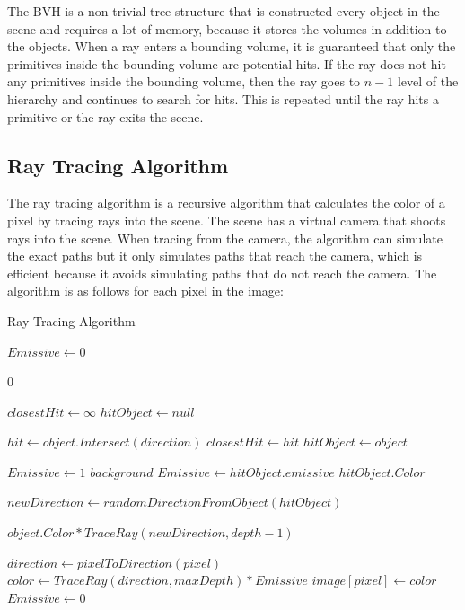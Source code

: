 \documentclass[12pt]{article}
\begin{document}
The BVH is a non-trivial tree structure that is constructed every object in the scene and requires a lot of memory, because
it stores the volumes in addition to the objects.
When a ray enters a bounding volume, it is guaranteed that only the primitives inside the bounding volume are potential hits.
If the ray does not hit any primitives inside the bounding volume, then the ray goes to $n-1$ level of the hierarchy and continues
to search for hits. This is repeated until the ray hits a primitive or the ray exits the scene.

\subsection{Ray Tracing Algorithm}

The ray tracing algorithm is a recursive algorithm that calculates the color of a pixel by tracing rays into the scene.
The scene has a virtual camera that shoots rays into the scene.
When tracing from the camera, the algorithm can simulate the exact paths but it only simulates paths that reach the camera,
which is efficient because it avoids simulating paths that do not reach the camera.
The algorithm is as follows for each pixel in the image:

\begin{algorithm}[H]
\caption{Ray Tracing Algorithm}
\label{alg:TraceRay}
\begin{algorithmic}[1]

\State $Emissive \gets 0$

        \State \Return $0$
    \EndIf

    \State $closestHit \gets \infty$
    \State $hitObject \gets null$

        \State $hit \gets object.Intersect(direction)$
            \State $closestHit \gets hit$
            \State $hitObject \gets object$
        \EndIf
    \EndFor

        \State $Emissive \gets 1$ 
        \State \Return $background$
    \EndIf
    \State $Emissive \gets hitObject.emissive$
     
        \State \Return $hitObject.Color$
    \EndIf

    \State $newDirection \gets randomDirectionFromObject(hitObject)$

    \State \Return $object.Color * TraceRay(newDirection, depth - 1)$

\EndProcedure

    \State $direction \gets pixelToDirection(pixel)$
    \State $color \gets TraceRay(direction, maxDepth) * Emissive$
    \State $image[pixel] \gets color$
    \State $Emissive \gets 0$ 
\EndFor

\end{algorithmic}
\end{algorithm}
\end{document}
